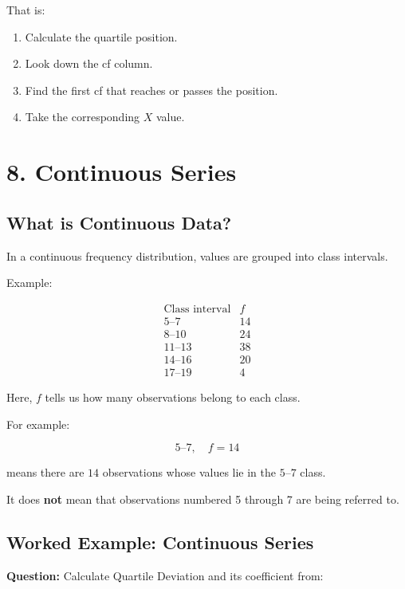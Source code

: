 \documentclass[12pt,a4paper]{article}
\begin{document}
That is:

\begin{enumerate}
    \item Calculate the quartile position.
    \item Look down the cf column.
    \item Find the first cf that reaches or passes the position.
    \item Take the corresponding $X$ value.
\end{enumerate}

\section{8. Continuous Series}

\subsection*{What is Continuous Data?}

In a continuous frequency distribution, values are grouped into class intervals.

Example:

\[
\begin{array}{c|c}
\text{Class interval}&f\\
\hline
5\text{--}7&14\\
8\text{--}10&24\\
11\text{--}13&38\\
14\text{--}16&20\\
17\text{--}19&4
\end{array}
\]

Here, $f$ tells us how many observations belong to each class.

For example:

\[
5\text{--}7,\quad f=14
\]

means there are $14$ observations whose values lie in the $5$--$7$ class.

It does \textbf{not} mean that observations numbered 5 through 7 are being referred to.

\subsection{Worked Example: Continuous Series}

\textbf{Question:} Calculate Quartile Deviation and its coefficient from:
\end{document}
